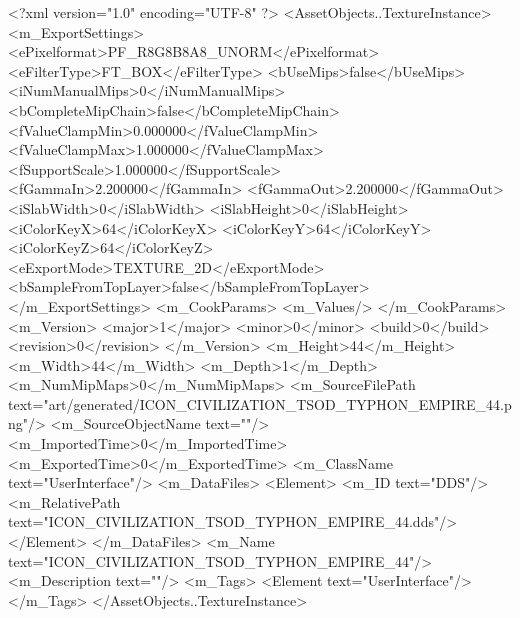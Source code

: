 <?xml version="1.0" encoding="UTF-8" ?>
<AssetObjects..TextureInstance>
	<m_ExportSettings>
		<ePixelformat>PF_R8G8B8A8_UNORM</ePixelformat>
		<eFilterType>FT_BOX</eFilterType>
		<bUseMips>false</bUseMips>
		<iNumManualMips>0</iNumManualMips>
		<bCompleteMipChain>false</bCompleteMipChain>
		<fValueClampMin>0.000000</fValueClampMin>
		<fValueClampMax>1.000000</fValueClampMax>
		<fSupportScale>1.000000</fSupportScale>
		<fGammaIn>2.200000</fGammaIn>
		<fGammaOut>2.200000</fGammaOut>
		<iSlabWidth>0</iSlabWidth>
		<iSlabHeight>0</iSlabHeight>
		<iColorKeyX>64</iColorKeyX>
		<iColorKeyY>64</iColorKeyY>
		<iColorKeyZ>64</iColorKeyZ>
		<eExportMode>TEXTURE_2D</eExportMode>
		<bSampleFromTopLayer>false</bSampleFromTopLayer>
	</m_ExportSettings>
	<m_CookParams>
		<m_Values/>
	</m_CookParams>
	<m_Version>
		<major>1</major>
		<minor>0</minor>
		<build>0</build>
		<revision>0</revision>
	</m_Version>
	<m_Height>44</m_Height>
	<m_Width>44</m_Width>
	<m_Depth>1</m_Depth>
	<m_NumMipMaps>0</m_NumMipMaps>
	<m_SourceFilePath text="art/generated/ICON_CIVILIZATION_TSOD_TYPHON_EMPIRE_44.png"/>
	<m_SourceObjectName text=""/>
	<m_ImportedTime>0</m_ImportedTime>
	<m_ExportedTime>0</m_ExportedTime>
	<m_ClassName text="UserInterface"/>
	<m_DataFiles>
		<Element>
			<m_ID text="DDS"/>
			<m_RelativePath text="ICON_CIVILIZATION_TSOD_TYPHON_EMPIRE_44.dds"/>
		</Element>
	</m_DataFiles>
	<m_Name text="ICON_CIVILIZATION_TSOD_TYPHON_EMPIRE_44"/>
	<m_Description text=""/>
	<m_Tags>
		<Element text="UserInterface"/>
	</m_Tags>
</AssetObjects..TextureInstance>
